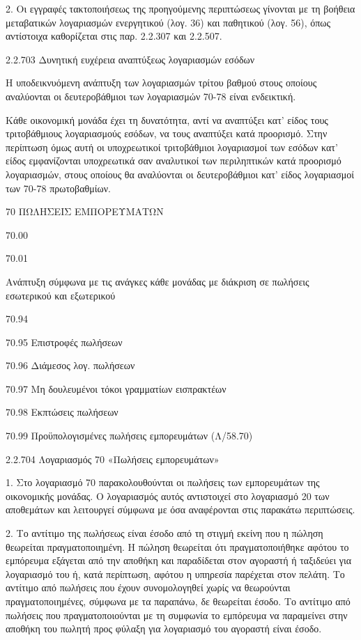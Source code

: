 \documentclass[A4,10pt,greek]{book}
\begin{document}
2. Οι εγγραφές τακτοποιήσεως της προηγούμενης περιπτώσεως γίνονται με τη βοήθεια μεταβατικών λογαριασμών ενεργητικού (λογ. 36) και παθητικού (λογ. 56), όπως αντίστοιχα καθορίζεται στις παρ. 2.2.307 και 2.2.507.

2.2.703 Δυνητική ευχέρεια αναπτύξεως λογαριασμών εσόδων

Η υποδεικνυόμενη ανάπτυξη των λογαριασμών τρίτου βαθμού στους οποίους αναλύονται οι δευτεροβάθμιοι των λογαριασμών 70-78 είναι ενδεικτική.

Κάθε οικονομική μονάδα έχει τη δυνατότητα, αντί να αναπτύξει κατ' είδος τους τριτοβάθμιους λογαριασμούς εσόδων, να τους αναπτύξει κατά προορισμό. Στην περίπτωση όμως αυτή οι υποχρεωτικοί τριτοβάθμιοι λογαριασμοί των εσόδων κατ' είδος εμφανίζονται υποχρεωτικά σαν αναλυτικοί των περιληπτικών κατά προορισμό λογαριασμών, στους οποίους θα αναλύονται οι δευτεροβάθμιοι κατ' είδος λογαριασμοί των 70-78 πρωτοβαθμίων.

70   ΠΩΛΗΣΕΙΣ ΕΜΠΟΡΕΥΜΑΤΩΝ

        70.00

        70.01

                    Ανάπτυξη σύμφωνα με τις ανάγκες κάθε μονάδας με διάκριση σε
                    πωλήσεις εσωτερικού και εξωτερικού

        70.94

        70.95    Επιστροφές πωλήσεων

        70.96    Διάμεσος λογ. πωλήσεων

        70.97    Μη δουλευμένοι τόκοι γραμματίων εισπρακτέων

        70.98    Εκπτώσεις πωλήσεων

        70.99    Προϋπολογισμένες πωλήσεις εμπορευμάτων (Λ/58.70)

2.2.704 Λογαριασμός 70 «Πωλήσεις εμπορευμάτων»

1. Στο λογαριασμό 70 παρακολουθούνται οι πωλήσεις των εμπορευμάτων της οικονομικής μονάδας. Ο λογαριασμός αυτός αντιστοιχεί στο λογαριασμό 20 των αποθεμάτων και λειτουργεί σύμφωνα με όσα αναφέρονται στις παρακάτω περιπτώσεις.

2. Το αντίτιμο της πωλήσεως είναι έσοδο από τη στιγμή εκείνη που η πώληση θεωρείται πραγματοποιημένη. Η πώληση θεωρείται ότι πραγματοποιήθηκε αφότου το εμπόρευμα εξάγεται από την αποθήκη και παραδίδεται στον αγοραστή ή ταξιδεύει για λογαριασμό του ή, κατά περίπτωση, αφότου η υπηρεσία παρέχεται στον πελάτη. Το αντίτιμο από πωλήσεις που έχουν συνομολογηθεί χωρίς να θεωρούνται πραγματοποιημένες, σύμφωνα με τα παραπάνω, δε θεωρείται έσοδο. Το αντίτιμο από πωλήσεις που πραγματοποιούνται με τη συμφωνία το εμπόρευμα να παραμείνει στην αποθήκη του πωλητή προς φύλαξη για λογαριασμό του αγοραστή είναι έσοδο.
\end{document}
